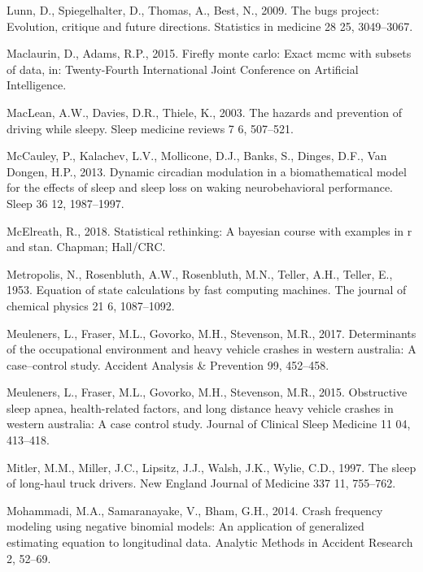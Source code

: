 \documentclass[12pt]{book}
\numberwithin{equation}{chapter}
\begin{document}
\leavevmode\hypertarget{ref-lunn2009bugs}{}%
Lunn, D., Spiegelhalter, D., Thomas, A., Best, N., 2009. The bugs project: Evolution, critique and future directions. Statistics in medicine 28 25, 3049--3067.

\leavevmode\hypertarget{ref-maclaurin2015firefly}{}%
Maclaurin, D., Adams, R.P., 2015. Firefly monte carlo: Exact mcmc with subsets of data, in: Twenty-Fourth International Joint Conference on Artificial Intelligence.

\leavevmode\hypertarget{ref-maclean2003hazards}{}%
MacLean, A.W., Davies, D.R., Thiele, K., 2003. The hazards and prevention of driving while sleepy. Sleep medicine reviews 7 6, 507--521.

\leavevmode\hypertarget{ref-mccauley2013dynamic}{}%
McCauley, P., Kalachev, L.V., Mollicone, D.J., Banks, S., Dinges, D.F., Van Dongen, H.P., 2013. Dynamic circadian modulation in a biomathematical model for the effects of sleep and sleep loss on waking neurobehavioral performance. Sleep 36 12, 1987--1997.

\leavevmode\hypertarget{ref-mcelreath2018statistical}{}%
McElreath, R., 2018. Statistical rethinking: A bayesian course with examples in r and stan. Chapman; Hall/CRC.

\leavevmode\hypertarget{ref-metropolis1953equation}{}%
Metropolis, N., Rosenbluth, A.W., Rosenbluth, M.N., Teller, A.H., Teller, E., 1953. Equation of state calculations by fast computing machines. The journal of chemical physics 21 6, 1087--1092.

\leavevmode\hypertarget{ref-meuleners2017determinants}{}%
Meuleners, L., Fraser, M.L., Govorko, M.H., Stevenson, M.R., 2017. Determinants of the occupational environment and heavy vehicle crashes in western australia: A case--control study. Accident Analysis \& Prevention 99, 452--458.

\leavevmode\hypertarget{ref-meuleners2015obstructive}{}%
Meuleners, L., Fraser, M.L., Govorko, M.H., Stevenson, M.R., 2015. Obstructive sleep apnea, health-related factors, and long distance heavy vehicle crashes in western australia: A case control study. Journal of Clinical Sleep Medicine 11 04, 413--418.

\leavevmode\hypertarget{ref-mitler1997sleep}{}%
Mitler, M.M., Miller, J.C., Lipsitz, J.J., Walsh, J.K., Wylie, C.D., 1997. The sleep of long-haul truck drivers. New England Journal of Medicine 337 11, 755--762.

\leavevmode\hypertarget{ref-mohammadi2014crash}{}%
Mohammadi, M.A., Samaranayake, V., Bham, G.H., 2014. Crash frequency modeling using negative binomial models: An application of generalized estimating equation to longitudinal data. Analytic Methods in Accident Research 2, 52--69.
\end{document}
